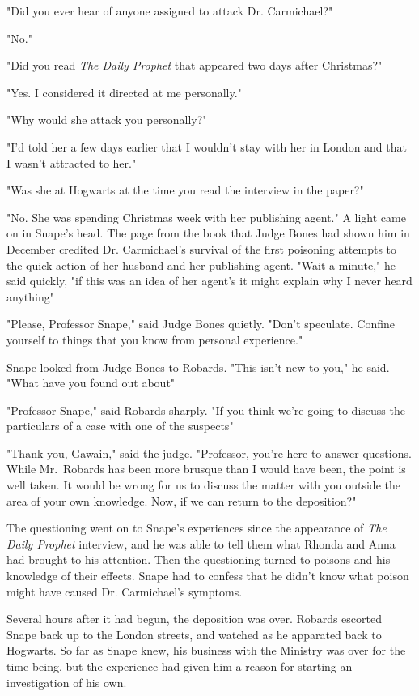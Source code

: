 "Did you ever hear of anyone assigned to attack Dr. Carmichael?"

"No."

"Did you read \emph{The Daily Prophet} that appeared two days after Christmas?"

"Yes. I considered it directed at me personally."

"Why would she attack you personally?"

"I'd told her a few days earlier that I wouldn't stay with her in London and that I wasn't attracted to her."

"Was she at Hogwarts at the time you read the interview in the paper?"

"No. She was spending Christmas week with her publishing agent." A light came on in Snape's head. The page from the book that Judge Bones had shown him in December credited Dr. Carmichael's survival of the first poisoning attempts to the quick action of her husband and her publishing agent. "Wait a minute," he said quickly, "if this was an idea of her agent's it might explain why I never heard anything{\el}"

"Please, Professor Snape," said Judge Bones quietly. "Don't speculate. Confine yourself to things that you know from personal experience."

Snape looked from Judge Bones to Robards. "This isn't new to you," he said. "What have you found out about{\el}"

"Professor Snape," said Robards sharply. "If you think we're going to discuss the particulars of a case with one of the suspects{\el}"

"Thank you, Gawain," said the judge. "Professor, you're here to answer questions. While Mr.~Robards has been more brusque than I would have been, the point is well taken. It would be wrong for us to discuss the matter with you outside the area of your own knowledge. Now, if we can return to the deposition?"

The questioning went on to Snape's experiences since the appearance of \emph{The Daily Prophet} interview, and he was able to tell them what Rhonda and Anna had brought to his attention. Then the questioning turned to poisons and his knowledge of their effects. Snape had to confess that he didn't know what poison might have caused Dr. Carmichael's symptoms.

Several hours after it had begun, the deposition was over. Robards escorted Snape back up to the London streets, and watched as he apparated back to Hogwarts. So far as Snape knew, his business with the Ministry was over for the time being, but the experience had given him a reason for starting an investigation of his own.

